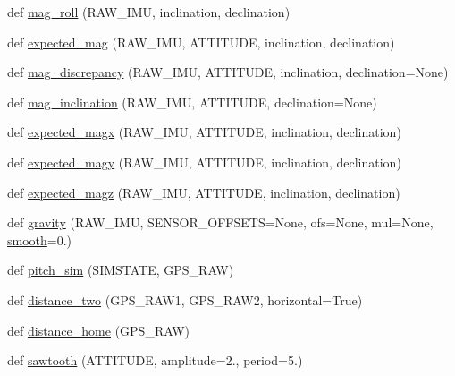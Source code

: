\begin{DoxyCompactItemize}
\item 
def \mbox{\hyperlink{namespacepymavlink_1_1mavextra_ae68ad6b7e203ece0fbb43d292c9e4c31}{mag\+\_\+roll}} (R\+A\+W\+\_\+\+I\+MU, inclination, declination)
\item 
def \mbox{\hyperlink{namespacepymavlink_1_1mavextra_ad27113b5ac550f5a63766348b74641eb}{expected\+\_\+mag}} (R\+A\+W\+\_\+\+I\+MU, A\+T\+T\+I\+T\+U\+DE, inclination, declination)
\item 
def \mbox{\hyperlink{namespacepymavlink_1_1mavextra_aaae8d1963031a79098cf818d480e0756}{mag\+\_\+discrepancy}} (R\+A\+W\+\_\+\+I\+MU, A\+T\+T\+I\+T\+U\+DE, inclination, declination=None)
\item 
def \mbox{\hyperlink{namespacepymavlink_1_1mavextra_a38cfb9a7f119e04fd6abee84eaca3adc}{mag\+\_\+inclination}} (R\+A\+W\+\_\+\+I\+MU, A\+T\+T\+I\+T\+U\+DE, declination=None)
\item 
def \mbox{\hyperlink{namespacepymavlink_1_1mavextra_aebb19fbb4880427930fb3c19ec91b01d}{expected\+\_\+magx}} (R\+A\+W\+\_\+\+I\+MU, A\+T\+T\+I\+T\+U\+DE, inclination, declination)
\item 
def \mbox{\hyperlink{namespacepymavlink_1_1mavextra_a961c101c8246849d791424520b2439e7}{expected\+\_\+magy}} (R\+A\+W\+\_\+\+I\+MU, A\+T\+T\+I\+T\+U\+DE, inclination, declination)
\item 
def \mbox{\hyperlink{namespacepymavlink_1_1mavextra_a9c3e49062cce7a6cf181d0ed8a0e0692}{expected\+\_\+magz}} (R\+A\+W\+\_\+\+I\+MU, A\+T\+T\+I\+T\+U\+DE, inclination, declination)
\item 
def \mbox{\hyperlink{namespacepymavlink_1_1mavextra_a762c44817d971674ece6d3c0cd90eedd}{gravity}} (R\+A\+W\+\_\+\+I\+MU, S\+E\+N\+S\+O\+R\+\_\+\+O\+F\+F\+S\+E\+TS=None, ofs=None, mul=None, \mbox{\hyperlink{nightmare_8c_acd159186e193428cba70578a92bafed2}{smooth}}=0.)
\item 
def \mbox{\hyperlink{namespacepymavlink_1_1mavextra_a600c961891b95309d492b08f957d1bf4}{pitch\+\_\+sim}} (S\+I\+M\+S\+T\+A\+TE, G\+P\+S\+\_\+\+R\+AW)
\item 
def \mbox{\hyperlink{namespacepymavlink_1_1mavextra_a3bab8b877b7cecdc6fbece56106fd74a}{distance\+\_\+two}} (G\+P\+S\+\_\+\+R\+A\+W1, G\+P\+S\+\_\+\+R\+A\+W2, horizontal=True)
\item 
def \mbox{\hyperlink{namespacepymavlink_1_1mavextra_a263fad301c730511059b3c9bb58248d8}{distance\+\_\+home}} (G\+P\+S\+\_\+\+R\+AW)
\item 
def \mbox{\hyperlink{namespacepymavlink_1_1mavextra_a4a70f6c6e6d7fa829901749b7e3d5546}{sawtooth}} (A\+T\+T\+I\+T\+U\+DE, amplitude=2., period=5.)

\end{DoxyCompactItemize}
